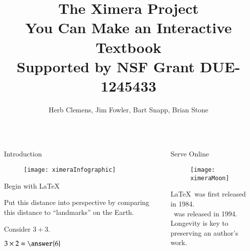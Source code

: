 \documentclass[serif,mathserif,final]{beamer}
\title{The Ximera Project \\ You Can Make an Interactive Textbook \\
\vspace{54pt}\large\textmd{Supported by NSF Grant DUE-1245433}}
\author{Herb Clemens, Jim Fowler, Bart Snapp, Brian Stone}
\begin{document}
{
\begin{frame}[fragile]{}
  \begin{columns}[t]

    \begin{column}{0.32\linewidth}

      \begin{block}{\rule{0pt}{1in}Introduction}
        \begin{figure}[htb]
          \centering
          \texttt{[image: ximeraInfographic]}
        \end{figure}
        \end{block}

        \begin{block}{\rule{0pt}{1in}Begin with \LaTeX}
\tiny
            \begin{pyglist}[language=latex]
\begin{problem}
Put this distance into perspective by
comparing this distance to ``landmarks''
on the Earth.
\begin{freeResponse}
\end{freeResponse}
\end{problem}

\begin{question}
  \begin{hint}
    Consider $3 + 3$.
  \end{hint}
  $3 \times 2 = \answer{6}$
\end{question}
            \end{pyglist}
      \end{block}


    \end{column}%

    \begin{column}{0.32\linewidth}

      \begin{block}{\rule{0pt}{1in}Serve Online}
        \begin{figure}[htb]
          \centering
          \texttt{[image: ximeraMoon]}
        \end{figure}
      \end{block}

      \begin{block}{\rule{0pt}{1in}\raisebox{.2\height}{Fight Bit Rot}}
\footnotesize 
\LaTeX\ was first released in 1984.\\
\LaTeXe\ was released in 1994. \\
Longevity is key to preserving an author's work.
      \end{block}


\end{column}
\end{columns}
\end{frame}}
\end{document}
